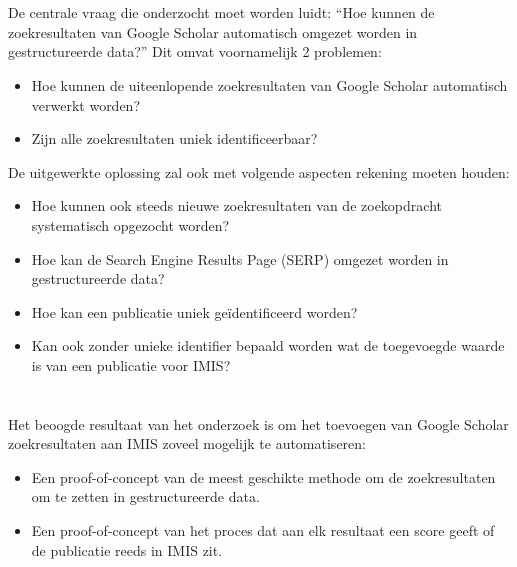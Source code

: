 \section{}%
\label{sec:onderzoeksvraag}

De centrale vraag die onderzocht moet worden luidt: ``Hoe kunnen de zoekresultaten van Google Scholar automatisch omgezet worden in gestructureerde data?''
Dit omvat voornamelijk 2 problemen:
\begin{itemize}
    \item Hoe kunnen de uiteenlopende zoekresultaten van Google Scholar automatisch verwerkt worden?
    \item Zijn alle zoekresultaten uniek identificeerbaar?
\end{itemize}
De uitgewerkte oplossing zal ook met volgende aspecten rekening moeten houden:
\begin{itemize}
    \item Hoe kunnen ook steeds nieuwe zoekresultaten van de zoekopdracht systematisch opgezocht worden?
    \item Hoe kan de Search Engine Results Page (SERP) omgezet worden in gestructureerde data?
    \item Hoe kan een publicatie uniek geïdentificeerd worden?
    \item Kan ook zonder unieke identifier bepaald worden wat de toegevoegde waarde is van een publicatie voor IMIS? 
\end{itemize}

\section{}%
\label{sec:onderzoeksdoelstelling}

Het beoogde resultaat van het onderzoek is om het toevoegen van Google Scholar zoekresultaten aan IMIS zoveel mogelijk te automatiseren:
\begin{itemize}
    \item Een proof-of-concept van de meest geschikte methode om de zoekresultaten om te zetten in gestructureerde data.
    \item Een proof-of-concept van het proces dat aan elk resultaat een score geeft of de publicatie reeds in IMIS zit.
\end{itemize}

\section{}%
\label{sec:opzet-bachelorproef}

